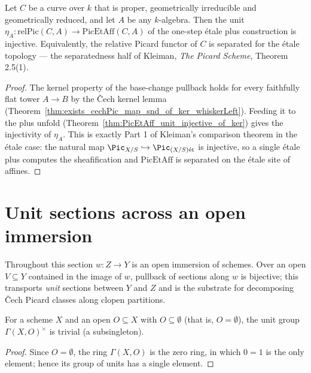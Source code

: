 \begin{theorem}
  \label{thm:PicEtAff_unit_injective}
  \leanok
  Let \(C\) be a curve over \(k\) that is proper, geometrically irreducible and geometrically
  reduced, and let \(A\) be any \(k\)-algebra.  Then the unit \(\eta_A \colon
  \mathrm{relPic}(C,A) \to \mathrm{PicEtAff}(C,A)\) of the one-step \'etale plus construction is
  injective.  Equivalently, the relative Picard functor of \(C\) is separated for the \'etale
  topology — the separatedness half of Kleiman, \emph{The Picard Scheme}, Theorem 2.5(1).
\end{theorem}
\begin{proof}
  \leanok
  The kernel property of the base-change pullback holds for every faithfully flat tower \(A \to
  B\) by the \v Cech kernel lemma
  (Theorem~\ref{thm:exists_cechPic_map_snd_of_ker_whiskerLeft}).  Feeding it to the plus unfold
  (Theorem~\ref{thm:PicEtAff_unit_injective_of_ker}) gives the injectivity of \(\eta_A\).  This
  is exactly Part 1 of Kleiman's comparison theorem in the \'etale case: the natural map
  \(\Pic_{X/S} \hookrightarrow \Pic_{(X/S)\mathrm{\acute et}}\) is injective, so a single
  \'etale plus computes the sheafification and \(\mathrm{PicEtAff}\) is separated on the \'etale
  site of affines.
\end{proof}


\section{Unit sections across an open immersion}

Throughout this section \(w \colon Z \to Y\) is an open immersion of schemes. Over an open
\(V \subseteq Y\) contained in the image of \(w\), pullback of sections along \(w\) is
bijective; this transports \emph{unit} sections between \(Y\) and \(Z\) and is the substrate
for decomposing \v Cech Picard classes along clopen partitions.

\begin{lemma}
  \label{lem:subsingleton_units_empty}
  \leanok
  For a scheme \(X\) and an open \(O \subseteq X\) with \(O \subseteq \emptyset\) (that is,
  \(O = \emptyset\)), the unit group \(\Gamma(X, O)^{\times}\) is trivial (a subsingleton).
\end{lemma}
\begin{proof}
  \leanok
  Since \(O = \emptyset\), the ring \(\Gamma(X, O)\) is the zero ring, in which \(0 = 1\) is the
  only element; hence its group of units has a single element.
\end{proof}

